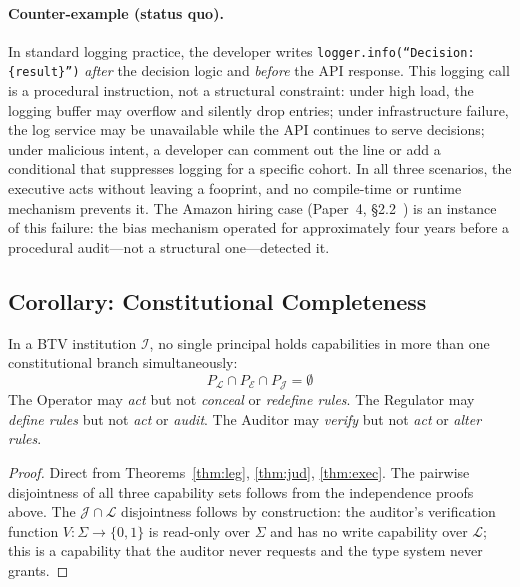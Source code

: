 \paragraph{Counter-example (status quo).}
In standard logging practice, the developer writes
\texttt{logger.info(``Decision: \{result\}'')} \emph{after} the
decision logic and \emph{before} the API response. This logging
call is a procedural instruction, not a structural constraint:
under high load, the logging buffer may overflow and silently drop
entries; under infrastructure failure, the log service may be
unavailable while the API continues to serve decisions; under
malicious intent, a developer can comment out the line or add a
conditional that suppresses logging for a specific cohort. In
all three scenarios, the executive acts without leaving a
fooprint, and no compile-time or runtime mechanism prevents it.
The Amazon hiring case (Paper~4, \S2.2~\cite{btv-econ}) is an
instance of this failure: the bias mechanism operated for
approximately four years before a procedural audit---not a structural
one---detected it.

\subsection{Corollary: Constitutional Completeness}
\label{subsec:completeness-proof}

\begin{corollary}
In a BTV institution $\mathcal{I}$, no single principal holds
capabilities in more than one constitutional branch simultaneously:
\[
  P_{\mathcal{L}} \cap P_{\mathcal{E}} \cap P_{\mathcal{J}} = \emptyset
\]
The Operator may \emph{act} but not \emph{conceal} or
\emph{redefine rules}. The Regulator may \emph{define rules} but not
\emph{act} or \emph{audit}. The Auditor may \emph{verify} but not
\emph{act} or \emph{alter rules}.
\end{corollary}

\begin{proof}
Direct from Theorems~\ref{thm:leg}, \ref{thm:jud}, \ref{thm:exec}.
The pairwise disjointness of all three capability sets follows from the
independence proofs above. The $\mathcal{J} \cap \mathcal{L}$
disjointness follows by construction: the auditor's verification
function $V : \Sigma \to \{0,1\}$ is read-only over $\Sigma$ and has
no write capability over $\mathcal{L}$; this is a capability that the
auditor never requests and the type system never grants.
\end{proof}

